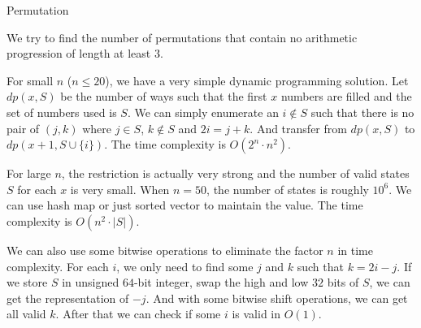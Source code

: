 \begin{tutorial}{Permutation}

We try to find the number of permutations that contain no arithmetic progression of length at least $3$.

For small $n$ ($n \le 20$), we have a very simple dynamic programming solution. Let $\mathit{dp}(x,S)$ be the number of ways such that the first $x$ numbers are filled and the set of numbers used is $S$. We can simply enumerate an $i \not \in S$ such that there is no pair of $(j,k)$ where $j \in S$, $k \not \in S$ and $2i=j+k$. And transfer from $\mathit{dp}(x,S)$ to $\mathit{dp}(x+1,S \cup \{i\})$. The time complexity is $O(2^n \cdot n^2)$.

For large $n$, the restriction is actually very strong and the number of valid states $S$ for each $x$ is very small. When $n=50$, the number of states is roughly $10^6$. We can use hash map or just sorted vector to maintain the value. The time complexity is $O(n^2 \cdot |S|)$.

We can also use some bitwise operations to eliminate the factor $n$ in time complexity. For each $i$, we only need to find some $j$ and $k$ such that $k=2i-j$. If we store $S$ in unsigned $64$-bit integer, swap the high and low $32$ bits of $S$, we can get the representation of $-j$. And with some bitwise shift operations, we can get all valid $k$. After that we can check if some $i$ is valid in $O(1)$.

\end{tutorial}
